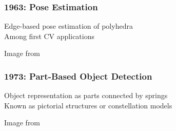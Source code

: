 \documentclass[xetex,professionalfont]{beamer}
\begin{document}

\begin{frame}
\frametitle{1963: Pose Estimation}

Edge-based pose estimation of polyhedra \\\medskip %
Among first CV applications %

\bigskip
\begin{center}
	{\centering Image from \cite{roberts1963}}
\end{center}

\end{frame}


\begin{frame}
\frametitle{1973: Part-Based Object Detection}

Object representation as parts connected by springs\\\medskip %
Known as pictorial structures or constellation models %

\bigskip
\begin{center}
	{\centering Image from \cite{fischler1973}}
\end{center}

\end{frame}
\end{document}
